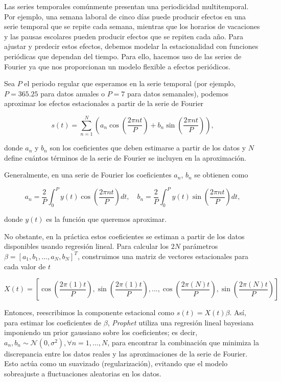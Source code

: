 \documentclass[12pt,twoside]{article}
\begin{document}
Las series temporales comúnmente presentan una periodicidad multitemporal. Por ejemplo, una semana laboral de cinco días puede producir efectos en una serie temporal que se repite cada semana, mientras que los horarios de vacaciones y las pausas escolares pueden producir efectos que se repiten cada año. Para ajustar y predecir estos efectos, debemos modelar la estacionalidad con funciones periódicas que dependan del tiempo. Para ello, hacemos uso de las series de Fourier ya que nos proporcionan un modelo flexible a efectos periódicos. 

Sea $P$ el periodo regular que esperamos en la serie temporal (por ejemplo, $P=365.25$ para datos anuales o $P=7$ para datos semanales), podemos aproximar los efectos estacionales a partir de la serie de Fourier 

\begin{equation}
s(t) = \sum_{n=1}^{N} \left( a_n \cos \left(\frac{2\pi n t}{P}\right) + b_n \sin \left( \frac{2\pi n t}{P}\right) \right),
\end{equation}

donde $a_n$ y $b_n$ son los coeficientes que deben estimarse a partir de los datos y $N$ define cuántos términos de la serie de Fourier se incluyen en la aproximación.

Generalmente, en una serie de Fourier los coeficientes $a_n$, $b_n$ se obtienen como

\begin{equation}
a_n = \frac{2}{P} \int_{0}^{P} y(t) \cos \left( \frac{2\pi n t}{P} \right) dt, \quad 
b_n = \frac{2}{P} \int_{0}^{P} y(t) \sin \left( \frac{2\pi n t}{P} \right) dt,
\end{equation}

donde $y(t)$ es la función que queremos aproximar.

No obstante, en la práctica estos coeficientes se estiman a partir de los datos disponibles usando regresión lineal. Para calcular los $2N$ parámetros $\beta = [ a_1, b_1, ..., a_N, b_N]^T$, construimos una matriz de vectores estacionales para cada valor de $t$ 

\begin{equation}
X(t) = \left[\cos \left(\frac{2\pi (1) t}{P}\right), \sin \left(\frac{2\pi (1) t}{P}\right), ..., \cos \left(\frac{2\pi (N) t}{P}\right), \sin \left(\frac{2\pi (N) t}{P}\right) \right]
\end{equation}

Entonces, reescribimos la componente estacional como $s(t) = X(t)\beta$. Así, para estimar los coeficientes de $\beta$, \textit{Prophet} utiliza una regresión lineal bayesiana imponiendo un prior gaussiano sobre los coeficientes; es decir, $a_n, b_n \sim \mathcal{N}(0, \sigma^2), \forall n = 1, \dots, N$, para encontrar la combinación que minimiza la discrepancia entre los datos reales y las aproximaciones de la serie de Fourier. Esto actúa como un suavizado (regularización), evitando que el modelo sobreajuste a fluctuaciones aleatorias en los datos.
\end{document}
